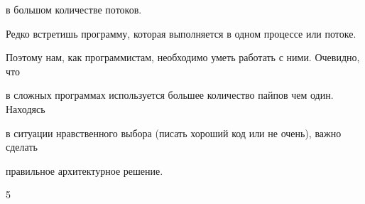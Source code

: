 \documentclass[a4paper,portrait,12pt]{article}
\begin{document}
\begin{flushleft}
в большом количестве потоков.
\end{flushleft}


\begin{flushleft}
Редко встретишь программу, которая выполняется в одном процессе или потоке.
\end{flushleft}


\begin{flushleft}
Поэтому нам, как программистам, необходимо уметь работать с ними. Очевидно, что
\end{flushleft}


\begin{flushleft}
в сложных программах используется большее количество пайпов чем один. Находясь
\end{flushleft}


\begin{flushleft}
в ситуации нравственного выбора (писать хороший код или не очень), важно сделать
\end{flushleft}


\begin{flushleft}
правильное архитектурное решение.
\end{flushleft}





5





\newpage
\end{document}
